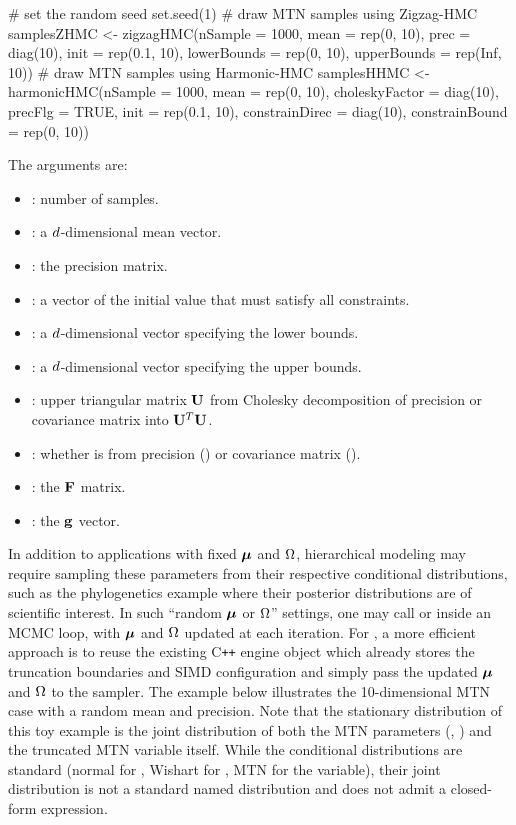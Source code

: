 \begin{example}
# set the random seed
set.seed(1)
# draw MTN samples using Zigzag-HMC 
samplesZHMC <- zigzagHMC(nSample = 1000, mean = rep(0, 10), prec = diag(10), 
                         init = rep(0.1, 10), lowerBounds = rep(0, 10), 
                         upperBounds = rep(Inf, 10))
# draw MTN samples using Harmonic-HMC 
samplesHHMC <- harmonicHMC(nSample = 1000, mean = rep(0, 10), choleskyFactor = diag(10),
		           precFlg = TRUE, init = rep(0.1, 10), 
		           constrainDirec = diag(10), constrainBound = rep(0, 10))
\end{example}
The arguments are:
\begin{itemize}
	\item {}: number of samples.
	\item {}: a $ d $-dimensional mean vector.
	\item {}: the precision matrix.
	\item {}: a vector of the initial value that must satisfy all constraints.
	\item {}: a $ d $-dimensional vector specifying the lower bounds.
	\item {}: a $ d $-dimensional vector specifying the upper bounds.
	\item {}: upper triangular matrix $ \mathbf{U} $ from Cholesky decomposition of precision or covariance matrix into $ \mathbf{U}^T\mathbf{U} $.
	\item {}: whether  is from precision () or covariance matrix ().
	\item {}: the $ \mathbf{F} $ matrix.
	\item {}: the $ \mathbf{g} $ vector.

\end{itemize}
In addition to applications with fixed $\bm{\mu}$ and $\Omega$, hierarchical modeling may require sampling these parameters from their respective conditional distributions, such as the phylogenetics example \citep{zhang2023accelerating} where their posterior distributions are of scientific interest. In such ``random $\bm{\mu}$ or $\Omega$'' settings, one may call  or  inside an MCMC loop, with $\bm{\mu}$ and $\Omega$ updated at each iteration. For \zhmc, a more efficient approach is to reuse the existing C\texttt{++} engine object which already stores the truncation boundaries and SIMD configuration and simply pass the updated $\bm{\mu}$ and $\Omega$ to the sampler. The example below illustrates the 10-dimensional MTN case with a random mean and precision. Note that the stationary distribution of this toy example is the joint distribution of both the MTN parameters (, ) and the truncated MTN variable itself. While the conditional distributions are standard (normal for , Wishart for , MTN for the variable), their joint distribution is not a standard named distribution and does not admit a closed-form expression.
